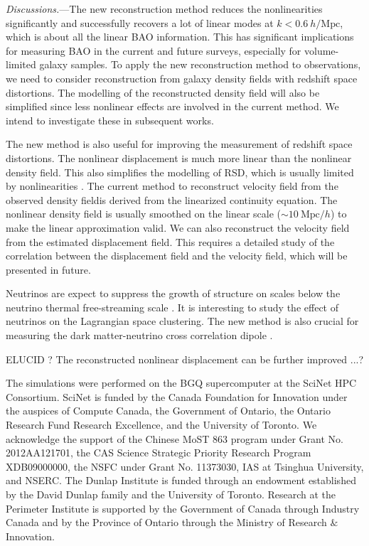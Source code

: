 \documentclass[aps,prl,twocolumn,showpacs,superscriptaddress,groupedaddress,nofootinbib]{revtex4}  %
\newcommand{\mr}{\mathrm}
\begin{document}
{\it Discussions.}---The new reconstruction method reduces the nonlinearities 
significantly and successfully recovers a lot of linear modes 
at $k<0.6\ h/\mr{Mpc}$, which is about all the linear BAO information.
This has significant implications for measuring BAO in the current and future 
surveys, especially for volume-limited galaxy samples. 
To apply the new reconstruction method to observations, we need to consider 
reconstruction from galaxy density fields with redshift space distortions.
The modelling of the reconstructed density field will also be simplified since
less nonlinear effects are involved in the current method.
We intend to investigate these in subsequent works. 

The new method is also useful for improving the measurement of redshift space
distortions. The nonlinear displacement is much more linear than
the nonlinear density field. 
This also simplifies the modelling of RSD, which is usually
limited by nonlinearities \cite{2013PhRvD..87f3526Z}.
The current method to reconstruct velocity field from the observed density 
fieldis derived from the linearized continuity equation. 
The nonlinear density field is usually smoothed on the linear scale
($\sim10\ \mr{Mpc}/h$) to make the linear approximation valid.
We can also reconstruct the velocity field from the estimated displacement 
field.
This requires a detailed study of the correlation between the displacement 
field and the velocity field, which will be presented in future.

Neutrinos are expect to suppress the growth of structure on scales below the 
neutrino thermal free-streaming scale \cite{1980bond,1997hu}.
It is interesting to study the effect of neutrinos on the Lagrangian space 
clustering. 
The new method is also crucial for measuring the dark matter-neutrino cross 
correlation dipole \cite{2014zhm,2016zhm}. 


ELUCID \cite{2014ApJ...794...94W}?
The reconstructed nonlinear displacement can be further improved ...?


The simulations were performed on the BGQ supercomputer at the SciNet HPC 
Consortium. SciNet is funded by the Canada Foundation for Innovation under 
the auspices of Compute Canada, the Government of Ontario, the Ontario Research 
Fund Research Excellence, and the University of Toronto.
We acknowledge the support of the Chinese MoST 863 program under Grant 
No. 2012AA121701, the CAS Science Strategic Priority Research Program 
XDB09000000, the NSFC under Grant No. 11373030, IAS at Tsinghua University, 
 and NSERC.
The Dunlap Institute is funded through an endowment established by the David Dunlap family and the University of Toronto.
Research at the Perimeter Institute is supported by the Government of Canada
through Industry Canada and by the Province of Ontario through the Ministry of
Research $\&$ Innovation.



\end{document}
